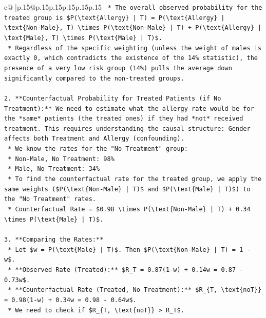 \documentclass{article}
\begin{document}
{\begin{supertabular}{c@{$\;$}|p{.15\linewidth}@{}p{.15\linewidth}p{.15\linewidth}p{.15\linewidth}p{.15\linewidth}p{.15\linewidth}}
{{{\texttt{    *   The overall observed probability for the treated group is \$P(\textbackslash{}text\{Allergy\} | T) = P(\textbackslash{}text\{Allergy\} | \textbackslash{}text\{Non{-}Male\}, T) \textbackslash{}times P(\textbackslash{}text\{Non{-}Male\} | T) + P(\textbackslash{}text\{Allergy\} | \textbackslash{}text\{Male\}, T) \textbackslash{}times P(\textbackslash{}text\{Male\} | T)\$.} \\
\texttt{    *   Regardless of the specific weighting (unless the weight of males is exactly 0, which contradicts the existence of the 14\% statistic), the presence of a very low risk group (14\%) pulls the average down significantly compared to the non{-}treated groups.} \\
\\ 
\texttt{2.  **Counterfactual Probability for Treated Patients (if No Treatment):** We need to estimate what the allergy rate would be for the *same* patients (the treated ones) if they had *not* received treatment. This requires understanding the causal structure: Gender affects both Treatment and Allergy (confounding).} \\
\texttt{    *   We know the rates for the "No Treatment" group:} \\
\texttt{        *   Non{-}Male, No Treatment: 98\%} \\
\texttt{        *   Male, No Treatment: 34\%} \\
\texttt{    *   To find the counterfactual rate for the treated group, we apply the same weights (\$P(\textbackslash{}text\{Non{-}Male\} | T)\$ and \$P(\textbackslash{}text\{Male\} | T)\$) to the "No Treatment" rates.} \\
\texttt{    *   Counterfactual Rate = \$0.98 \textbackslash{}times P(\textbackslash{}text\{Non{-}Male\} | T) + 0.34 \textbackslash{}times P(\textbackslash{}text\{Male\} | T)\$.} \\
\\ 
\texttt{3.  **Comparing the Rates:**} \\
\texttt{    *   Let \$w = P(\textbackslash{}text\{Male\} | T)\$. Then \$P(\textbackslash{}text\{Non{-}Male\} | T) = 1 {-} w\$.} \\
\texttt{    *   **Observed Rate (Treated):** \$R\_T = 0.87(1{-}w) + 0.14w = 0.87 {-} 0.73w\$.} \\
\texttt{    *   **Counterfactual Rate (Treated, No Treatment):** \$R\_\{T, \textbackslash{}text\{noT\}\} = 0.98(1{-}w) + 0.34w = 0.98 {-} 0.64w\$.} \\
\texttt{    *   We need to check if \$R\_\{T, \textbackslash{}text\{noT\}\} > R\_T\$.} \\
}}}
\end{supertabular}}
\end{document}
